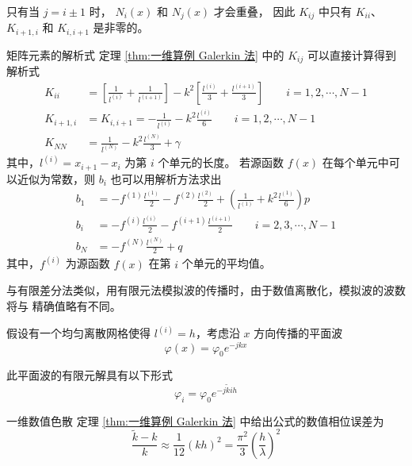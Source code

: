 \begin{note}
    只有当 $j=i\pm1$ 时，
    $N_i(x)$ 和 $N_j(x)$ 才会重叠，
    因此 $K_{ij}$ 中只有 $K_{ii}$、$K_{i+1,i}$ 
    和 $K_{i,i+1}$ 是非零的。
\end{note}

\begin{theorem}{矩阵元素的解析式}
    定理 \ref{thm:一维算例 Galerkin 法} 中的 $K_{ij}$
    可以直接计算得到解析式
    \begin{align}
        K_{ii}&=
        \left[
            \frac{1}{l^{(i)}}+\frac{1}{l^{(i+1)}}    
        \right]
        -k^2\left[
            \frac{l^{(i)}}{3}+\frac{l^{(i+1)}}{3}
        \right]
        \qquad i=1,2,\cdots,N-1\\
        K_{i+1,i}&=K_{i,i+1}=
        -\frac{1}{l^{(i)}}-k^2\frac{l^{(i)}}{6}
        \qquad i=1,2,\cdots,N-1\\
        K_{NN}&=\frac{1}{l^{(N)}}-k^2\frac{l^{(N)}}{3}
        +\gamma
    \end{align}
    其中，$l^{(i)}=x_{i+1}-x_i$ 为第 $i$ 个单元的长度。
    若源函数 $f(x)$ 在每个单元中可以近似为常数，则
    $b_i$ 也可以用解析方法求出
    \begin{align}
        b_1&=-f^{(1)}\frac{l^{(1)}}{2}
        -f^{(2)}\frac{l^{(2)}}{2}
        +\left(
            \frac{1}{l^{(1)}}+k^2\frac{l^{(1)}}{6}
        \right)p\\
        b_i&=-f^{(i)}\frac{l^{(i)}}{2}
        -f^{(i+1)}\frac{l^{(i+1)}}{2}\qquad i=2,3,\cdots,N-1\\
        b_N&=-f^{(N)}\frac{l^{(N)}}{2}+q
    \end{align}
    其中，$f^{(i)}$ 为源函数 $f(x)$ 在第 $i$ 个单元的平均值。
\end{theorem}

\par 与有限差分法类似，用有限元法模拟波的传播时，由于数值离散化，模拟波的波数将与
精确值略有不同。
\par 假设有一个均匀离散网格使得 $l^{(i)}=h$，考虑沿 $x$ 方向传播的平面波
\begin{equation}
    \varphi(x) = \varphi_0e^{-jkx}
\end{equation}
\par 此平面波的有限元解具有以下形式
\begin{equation}
    \varphi_i = \varphi_0e^{-j\tilde{k}ih}
    \label{一维有限元解}
\end{equation}

\begin{theorem}{一维数值色散}
    定理 \ref{thm:一维算例 Galerkin 法} 中给出公式的数值相位误差为
    \begin{equation}
        \frac{\tilde{k}-k}{k}
        \approx\frac{1}{12}(kh)^2
        =\frac{\pi^2}{3}\left(\frac{h}{\lambda}\right)^2
    \end{equation}
\end{theorem}

